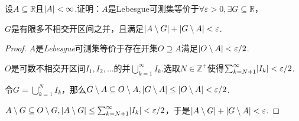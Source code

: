 \begin{comment}
\begin{problem}[4]\label{2.D.4}
    设\(U\)是任意非平凡区间组成的集合\(\mathcal{I}\)之并\(\bigcup_{I \in \mathcal{I}}I\)，

    证明：\(U\)可以表示为\(\mathcal{I}\)的可数子集的并集.
\end{problem}

\begin{proof}
    设\(\mathcal{J}=\{(p,q): p,q \in \mathbb{Q}, (p,q) \subseteq I \in \mathcal{I}\}\)，则\(\mathcal{J}\)是可数集.
    
    为\(\mathcal{J}\)中的每个\((p,q)\)在\(\mathcal{I}\)中选择一个包含它的集合\(I_c\)，令\(\mathcal{R}=\{I_c \in \mathcal{I}: (p,q) \subseteq I_c\}\).

    令\(U_c=\bigcup_{I \in \mathcal{R}}I\)，显然\(U_c \subseteq U\).考虑\(\forall x \in U, \exists p,q \in \mathbb{Q}, x \in (p,q) \in \mathcal{J}\).

    于是\(\exists I_c \in \mathcal{R}, (p,q) \subseteq I_c \in \mathcal{R}, x \in I_c\)，故\(x \in I_c \subseteq U_c, U \subseteq U_c\)，证毕.
\end{proof}
\end{comment}

\begin{comment}
\begin{problem}[5]\label{2.D.5}
    证明若\(A \subseteq \mathbb{R}\)是Lebesgue可测集，则存在闭集\(F_1 \subseteq F_2 \subseteq \dots \subseteq A\)，

    且满足\(\abs*{A \setminus \bigcup_{n=1}^\infty F_n}=0\).
\end{problem}

\begin{proof}
    令闭集\(D_k\)满足\(\abs*{A \setminus D_k}<1/k\)，令\(F_n=\bigcup_{k=1}^n D_k\).
\end{proof}
\end{comment}

\begin{problem}[6]\label{2.D.6}
    设\(A \subseteq \mathbb{R}\)且\(\abs*{A}<\infty\).证明：\(A\)是Lebesgue可测集等价于\(\forall \varepsilon>0, \exists G \subseteq \mathbb{R}\)，

    \(G\)是有限多不相交开区间之并，且满足\(\abs*{A \setminus G}+\abs*{G \setminus A}<\varepsilon\).
\end{problem}

\begin{proof}
    \(A\)是\textit{Lebesgue}可测集等价于存在开集\(O \supseteq A\)满足\(\abs*{O \setminus A}<\varepsilon/2\).

    \(O\)是可数不相交开区间\(I_1, I_2, \dots\)的并\(\bigcup_{k=1}^\infty I_k\).选取\(N \in \mathbb{Z}^+\)使得\(\sum_{k=N+1}^\infty \abs*{I_k}<\varepsilon/2\).

    令\(G=\bigcup_{k=1}^N I_k\)，那么\(G \setminus A \subseteq O \setminus A, \abs*{G \setminus A} \leq \abs*{O \setminus A}<\varepsilon/2\).

    \(A \setminus G \subseteq O \setminus G, \abs*{A \setminus G} \leq \sum_{k=N+1}^\infty \abs*{I_k}<\varepsilon/2\)，于是\(\abs*{A \setminus G}+\abs*{G \setminus A}<\varepsilon\).
\end{proof}

